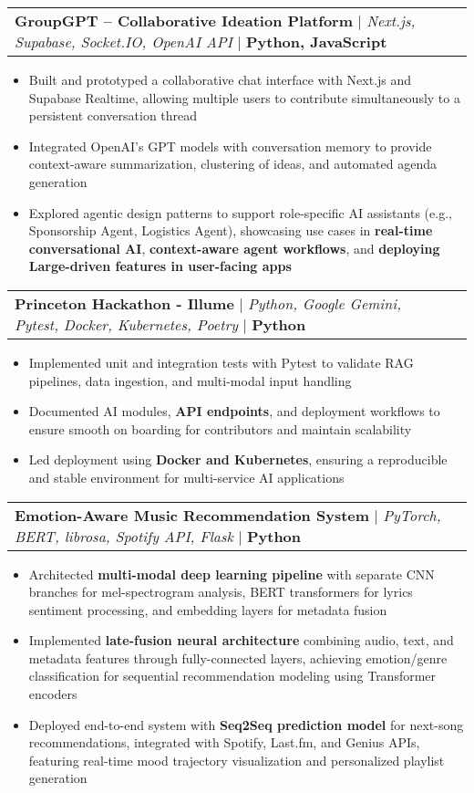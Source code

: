 \documentclass[letterpaper,10pt]{article}
\makeatletter
\newcommand{\resumeItem}[1]{
  \item\small{
    {#1 \vspace{-3pt}}
  }
}
\newcommand{\resumeProjectHeading}[2]{
    \item
    \begin{tabular*}{0.97\textwidth}{l@{\extracolsep{\fill}}r}
      \small#1 & #2 \\
    \end{tabular*}\vspace{-9pt}
}
\newcommand{\resumeItemListStart}{\begin{itemize}}
\newcommand{\resumeItemListEnd}{\end{itemize}\vspace{-7pt}}
\makeatother
\begin{document}
    \vspace{20pt}
    
    \resumeProjectHeading
    {\textbf{GroupGPT – Collaborative Ideation Platform} $|$ \emph{Next.js, Supabase, Socket.IO, OpenAI API} $|$ \textbf{Python, JavaScript}}{}
  \resumeItemListStart 
    \resumeItem{Built and prototyped a collaborative chat interface with Next.js and Supabase Realtime, allowing multiple users to contribute simultaneously to a persistent conversation thread}
    \resumeItem{Integrated OpenAI’s GPT models with conversation memory to provide context-aware summarization, clustering of ideas, and automated agenda generation}
    \resumeItem{Explored agentic design patterns to support role-specific AI assistants (e.g., Sponsorship Agent, Logistics Agent), showcasing use cases in \textbf{real-time conversational AI}, \textbf{context-aware agent workflows}, and \textbf{deploying Large-driven features in user-facing apps}}
  \resumeItemListEnd

  \vspace{-10pt}
    
        \resumeProjectHeading
        {\textbf{Princeton Hackathon - Illume} $|$ \emph{Python, Google Gemini, Pytest, Docker, Kubernetes, Poetry } $|$ \textbf{Python}}{}
          \resumeItemListStart
           \resumeItem{Implemented unit and integration tests with Pytest to validate RAG pipelines, data ingestion, and multi-modal input handling}
           \resumeItem{Documented AI modules, \textbf{API endpoints}, and deployment workflows to ensure smooth on boarding for contributors and maintain scalability}
           \resumeItem{Led deployment using \textbf{Docker and Kubernetes}, ensuring a reproducible and stable environment for multi-service AI applications}
          \resumeItemListEnd

        \resumeProjectHeading
            {\textbf{Emotion-Aware Music Recommendation System} $|$ \emph{PyTorch, BERT, librosa, Spotify API, Flask} $|$ \textbf{Python}}{}
          \resumeItemListStart
           \resumeItem{Architected \textbf{multi-modal deep learning pipeline} with separate CNN branches for mel-spectrogram analysis, BERT transformers for lyrics sentiment processing, and embedding layers for metadata fusion}
           \resumeItem{Implemented \textbf{late-fusion neural architecture} combining audio, text, and metadata features through fully-connected layers, achieving emotion/genre classification for sequential recommendation modeling using Transformer encoders}
            \resumeItem{Deployed end-to-end system with \textbf{Seq2Seq prediction model} for next-song recommendations, integrated with Spotify, Last.fm, and Genius APIs, featuring real-time mood trajectory visualization and personalized playlist generation}
          \resumeItemListEnd
\end{document}

